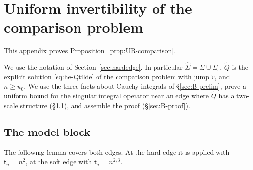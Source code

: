 \providecommand{\Cauchy}{\mathcal{C}}
\providecommand{\dC}{\partial\mathcal{C}}
\providecommand{\Sighat}{\hat\Sigma}
\providecommand{\Sigcirc}{\Sigma_{\circ}}
\providecommand{\Fi}[1]{\textup{(F#1)}}
\providecommand{\Pinfz}{P^\infty_0}
\providecommand{\Phat}{\hat P}

\section{Uniform invertibility of the comparison problem}\label{app:resolvent}

This appendix proves Proposition~\ref{prop:UR-comparison}.

We use the notation of Section~\ref{sec:hardedge}. In particular $\Sighat=\Sigma\cup\Sigcirc$, $\tilde Q$ is the explicit
solution \eqref{eq:he-Qtilde} of the comparison problem with jump $\tilde v$, and $n\ge n_0$. We use the three facts
about Cauchy integrals of \S\ref{sec:B-prelim}, prove a uniform bound for the singular integral operator near an edge
where $\tilde Q$ has a two-scale structure (\S\ref{sec:B-block}), and assemble the proof (\S\ref{sec:B-proof}).

\subsection{The model block}\label{sec:B-block}

The following lemma covers both edges. At the hard edge it is applied with $\mathsf t_n=n^2$, at the soft edge with
$\mathsf t_n=n^{2/3}$.

